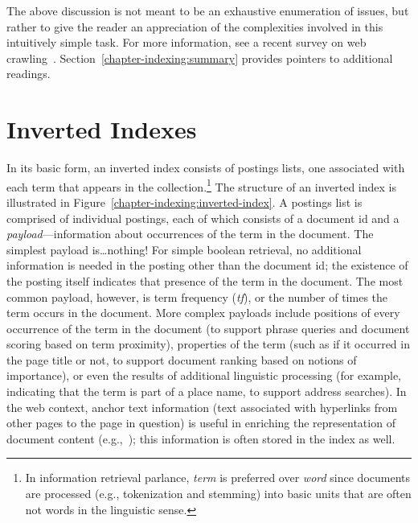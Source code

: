 \noindent The above discussion is not meant to be an exhaustive
enumeration of issues, but rather to give the reader an appreciation
of the complexities involved in this intuitively simple task.  For
more information, see a recent survey on web
crawling~\cite{Olston_Najork_2010}.
Section~\ref{chapter-indexing:summary} provides pointers to additional
readings.

\section{Inverted Indexes}
\label{chapter-indexing:intro}

In its basic form, an inverted index consists of postings lists, one
associated with each term that appears in the collection.\footnote{In
  information retrieval parlance, \emph{term} is preferred over \emph{
    word} since documents are processed (e.g., tokenization and
  stemming) into basic units that are often not words in the
  linguistic sense.} The structure of an inverted index is illustrated
in Figure~\ref{chapter-indexing:inverted-index}.  A postings list is
comprised of individual postings, each of which consists of a document
id and a \emph{payload}---information about occurrences of the term in
the document.  The simplest payload is\ldots nothing!  For simple
boolean retrieval, no additional information is needed in the posting
other than the document id; the existence of the posting itself
indicates that presence of the term in the document.  The most common
payload, however, is term frequency (\emph{tf}), or the number of times
the term occurs in the document.  More complex payloads include
positions of every occurrence of the term in the document (to support
phrase queries and document scoring based on term proximity),
properties of the term (such as if it occurred in the page title or
not, to support document ranking based on notions of importance), or
even the results of additional linguistic processing (for example,
indicating that the term is part of a place name, to support address
searches).  In the web context, anchor text information (text
associated with hyperlinks from other pages to the page in question)
is useful in enriching the representation of document content
(e.g.,~\cite{Metzler_etal_2009}); this information is often stored in
the index as well.

